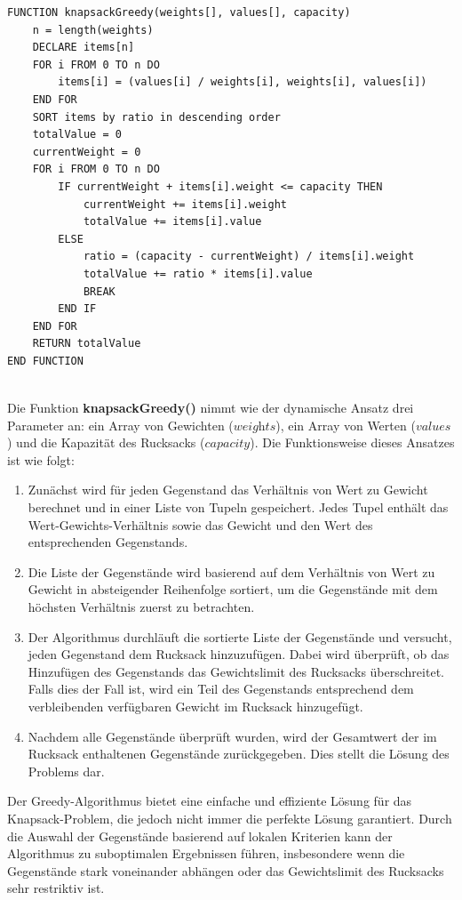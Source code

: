 \begin{lstlisting}[style=csharp, caption={Greedy Algorithmus}]
FUNCTION knapsackGreedy(weights[], values[], capacity)
    n = length(weights)
    DECLARE items[n]
    FOR i FROM 0 TO n DO
        items[i] = (values[i] / weights[i], weights[i], values[i])
    END FOR
    SORT items by ratio in descending order
    totalValue = 0
    currentWeight = 0
    FOR i FROM 0 TO n DO
        IF currentWeight + items[i].weight <= capacity THEN
            currentWeight += items[i].weight
            totalValue += items[i].value
        ELSE
            ratio = (capacity - currentWeight) / items[i].weight
            totalValue += ratio * items[i].value
            BREAK
        END IF
    END FOR
    RETURN totalValue
END FUNCTION
\end{lstlisting}\\
Die Funktion \textbf{knapsackGreedy()} nimmt wie der dynamische Ansatz drei Parameter an: ein Array von Gewichten (\( \textit{weights} \)),
ein Array von Werten (\( \textit{values} \)) und die Kapazität des Rucksacks (\( \textit{capacity} \)). Die Funktionsweise
dieses Ansatzes ist wie folgt:

\begin{enumerate}
\item Zunächst wird für jeden Gegenstand das Verhältnis von Wert zu Gewicht berechnet und in einer Liste von Tupeln
gespeichert. Jedes Tupel enthält das Wert-Gewichts-Verhältnis sowie das Gewicht und den Wert des entsprechenden Gegenstands.
\item Die Liste der Gegenstände wird basierend auf dem Verhältnis von Wert zu Gewicht in absteigender Reihenfolge
sortiert, um die Gegenstände mit dem höchsten Verhältnis zuerst zu betrachten.
\item Der Algorithmus durchläuft die sortierte Liste der Gegenstände und versucht, jeden Gegenstand dem Rucksack
hinzuzufügen. Dabei wird überprüft, ob das Hinzufügen des Gegenstands das Gewichtslimit des Rucksacks überschreitet.
Falls dies der Fall ist, wird ein Teil des Gegenstands entsprechend dem verbleibenden verfügbaren Gewicht im Rucksack hinzugefügt.
\item Nachdem alle Gegenstände überprüft wurden, wird der Gesamtwert der im Rucksack enthaltenen Gegenstände zurückgegeben.
Dies stellt die Lösung des Problems dar.
\end{enumerate}

Der Greedy-Algorithmus bietet eine einfache und effiziente Lösung für das Knapsack-Problem, die jedoch nicht immer die
perfekte Lösung garantiert. Durch die Auswahl der Gegenstände basierend auf lokalen Kriterien kann der Algorithmus zu
suboptimalen Ergebnissen führen, insbesondere wenn die Gegenstände stark voneinander abhängen oder das Gewichtslimit des
Rucksacks sehr restriktiv ist.

